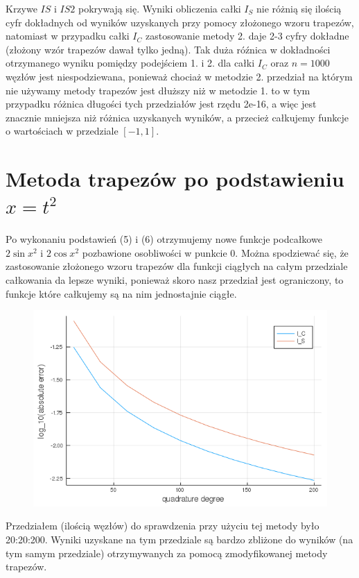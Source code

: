 \documentclass{article}
\begin{document}
Krzywe $IS$ i $IS2$ pokrywają się. Wyniki obliczenia całki $I_S$ nie różnią się ilością cyfr dokładnych od wyników uzyskanych przy pomocy złożonego wzoru trapezów, natomiast w przypadku całki $I_C$ zastosowanie metody 2. daje 2-3 cyfry dokładne (złożony wzór trapezów dawał tylko jedną). Tak duża róźnica w dokładności otrzymanego wyniku pomiędzy podejściem 1. i 2. dla całki $I_C$ oraz $n=1000$ węzłów jest niespodziewana, ponieważ chociaż w metodzie 2. przedział na którym nie używamy metody trapezów jest dłuższy niż w metodzie 1. to w tym przypadku różnica długości tych przedziałów jest rzędu 2e-16, a więc jest znacznie mniejsza niż różnica uzyskanych wyników, a przecież całkujemy funkcje o wartościach w przedziale $[-1,1]$.

\section*{Metoda trapezów po podstawieniu $x=t^2$}
Po wykonaniu podstawień (5) i (6) otrzymujemy nowe funkcje podcałkowe $2\sin{x^2}$ i $2\cos{x^2}$ pozbawione osobliwości w punkcie 0. Można spodziewać się, że zastosowanie złożonego wzoru trapezów dla funkcji ciągłych na całym przedziale całkowania da lepsze wyniki, ponieważ skoro nasz przedział jest ograniczony, to funkcje które całkujemy są na nim jednostajnie ciągłe.

\newpage

\begin{figure}[ht]
    \includegraphics[scale=0.5]{WykresClogabsolute.png}
    \label{wykresC}
\end{figure}

Przedziałem (ilością węzłów) do sprawdzenia przy użyciu tej metody było 20:20:200. Wyniki uzyskane na tym przedziale są bardzo zbliżone do wyników (na tym samym przedziale) otrzymywanych za pomocą zmodyfikowanej metody trapezów.
\end{document}
